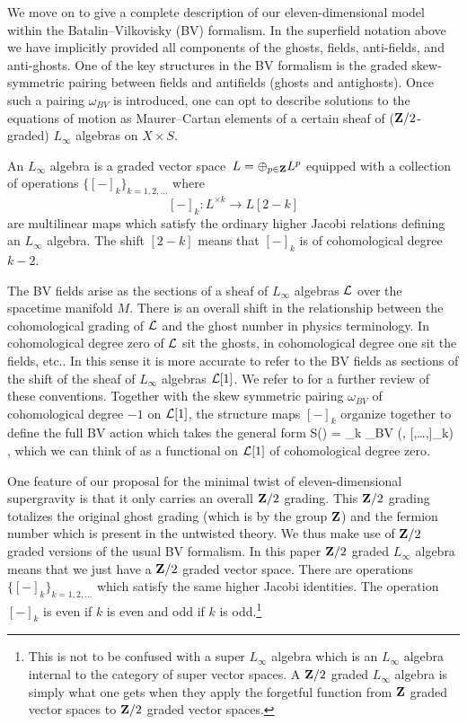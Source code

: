 

\parsec[s:Lsugra]

We move on to give a complete description of our eleven-dimensional model within the Batalin--Vilkovisky (BV) formalism.
In the superfield notation above we have implicitly provided all components of the ghosts, fields, anti-fields, and anti-ghosts.
One of the key structures in the BV formalism is the graded skew-symmetric pairing between fields and antifields (ghosts and antighosts).
Once such a pairing $\omega_{BV}$ is introduced, one can opt to describe solutions to the equations of motion as Maurer--Cartan elements of a certain sheaf of ($\mathbf{Z}/2$-graded) $L_\infty$ algebras on $X \times S$.

An $L_\infty$ algebra is a graded vector space~$L=\oplus_{p\in \mathbf{Z}} L^p$ equipped with a collection of operations $\{[-]_k\}_{k = 1,2,\ldots}$ where 
\[
[-]_k \colon L^{\times k} \to L[2-k] 
\]
are multilinear maps which satisfy the ordinary higher Jacobi relations defining an $L_\infty$ algebra.
The shift $[2-k]$ means that $[-]_k$ is of cohomological degree $k-2$. 

The BV fields arise as the sections of a sheaf of $L_\infty$ algebras $\mathcal L$ over the spacetime manifold $M$.
There is an overall shift in the relationship between the cohomological grading of $\mathcal L$ and the ghost number in physics terminology. 
In cohomological degree zero of $\mathcal L$ sit the ghosts, in cohomological degree one sit the fields, etc..
In this sense it is more accurate to refer to the BV fields as sections of the shift of the sheaf of $L_\infty$ algebras $\mathcal L[1]$. 
We refer to \cite{CG2,ESW} for a further review of these conventions.
Together with the skew symmetric pairing $\omega_{BV}$ of cohomological degree $-1$ on $\mathcal L[1]$, the structure maps $[-]_k$ organize together to define the full BV action which takes the general form
\beqn
\label{eqn:Sbv}
S(\Phi) = \sum_{k } \omega_{BV} \left(\Phi , [\Phi,\ldots,\Phi]_{k}\right) ,
\eeqn
which we can think of as a functional on $\mathcal L[1]$ of cohomological degree zero.

One feature of our proposal for the minimal twist of eleven-dimensional supergravity is that it only carries an overall $\mathbf{Z}/2$ grading. 
This $\mathbf{Z}/2$ grading totalizes the original ghost grading (which is by the group $\mathbf{Z}$) and the fermion number which is present in the untwisted theory.
We thus make use of $\mathbf{Z}/2$ graded versions of the usual BV formalism.
In this paper $\mathbf{Z}/2$ graded $L_\infty$ algebra means that we just have a $\mathbf{Z}/2$ graded vector space.
There are operations $\{[-]_k\}_{k = 1,2,\ldots}$ which satisfy the same higher Jacobi identities.
The operation $[-]_k$ is even if $k$ is even and odd if $k$ is odd.\footnote{This is not to be confused with a super $L_\infty$ algebra which is an $L_\infty$ algebra internal to the category of super vector spaces.
A $\mathbf{Z}/2$ graded $L_\infty$ algebra is simply what one gets when they apply the forgetful function from $\mathbf{Z}$ graded vector spaces to $\mathbf{Z}/2$ graded vector spaces.}

